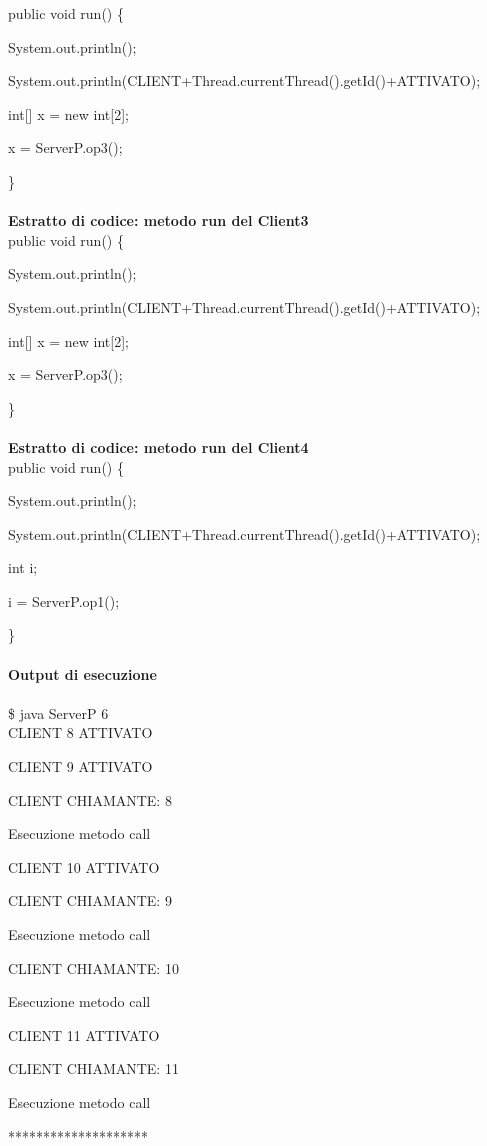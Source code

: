 \documentclass[10pt, a4paper]{article}
\begin{document}
public void run() \{

		System.out.println();

        	System.out.println(CLIENT+Thread.currentThread().getId()+ATTIVATO);

		int[] x = new int[2];

		x = ServerP.op3();

\}
\\\\
\textbf{Estratto di codice: metodo run del Client3}
\\

public void run() \{

		System.out.println();

        	System.out.println(CLIENT+Thread.currentThread().getId()+ATTIVATO);

		int[] x = new int[2];

		x = ServerP.op3();

\}
\\\\
\textbf{Estratto di codice: metodo run del Client4}
\\

public void run() \{

		System.out.println();

        	System.out.println(CLIENT+Thread.currentThread().getId()+ATTIVATO);

		int i;

		i = ServerP.op1();

\}
\\\\
\textbf{Output di esecuzione}
\\\\
\$ java ServerP 6
\\

CLIENT 8 ATTIVATO

CLIENT 9 ATTIVATO

CLIENT CHIAMANTE: 8

Esecuzione metodo call

CLIENT 10 ATTIVATO

CLIENT CHIAMANTE: 9

Esecuzione metodo call

CLIENT CHIAMANTE: 10

Esecuzione metodo call

CLIENT 11 ATTIVATO

CLIENT CHIAMANTE: 11

Esecuzione metodo call

********************
\end{document}
